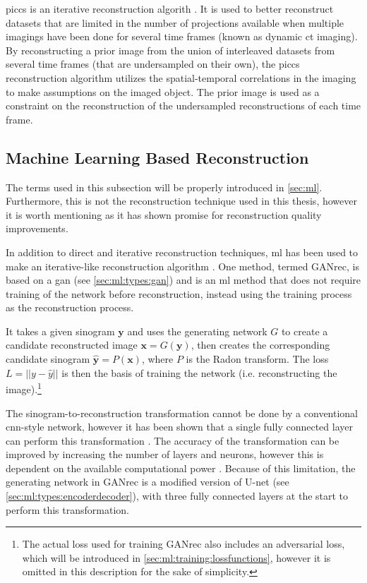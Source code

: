 \Gls{piccs} is an iterative reconstruction algorith \cite{piccs}. It is used to better reconstruct datasets that are limited in the number of projections available when multiple imagings have been done for several time frames (known as dynamic \gls{ct} imaging). By reconstructing a prior image from the union of interleaved datasets from several time frames (that are undersampled on their own), the \gls{piccs} reconstruction algorithm utilizes the spatial-temporal correlations in the imaging to make assumptions on the imaged object. The prior image is used as a constraint on the reconstruction of the undersampled reconstructions of each time frame. 


\subsection{Machine Learning Based Reconstruction}
The terms used in this subsection will be properly introduced in \cref{sec:ml}. Furthermore, this is not the reconstruction technique used in this thesis, however it is worth mentioning as it has shown promise for reconstruction quality improvements. 

In addition to direct and iterative reconstruction techniques, \gls{ml} has been used to make an iterative-like reconstruction algorithm \cite{GANrec}. One method, termed GANrec, is based on a \gls{gan} (see \cref{sec:ml:types:gan}) and is an \gls{ml} method that does not require training of the network before reconstruction, instead using the training process as the reconstruction process. 

It takes a given sinogram $\bm{y}$ and uses the generating network $G$ to create a candidate reconstructed image $\bm{x} = G(\bm{y})$, then creates the corresponding candidate sinogram $\hat{\bm{y}} = P(\bm{x})$, where $P$ is the Radon transform. The loss $L = \left|\left| y - \hat{y} \right|\right|$ is then the basis of training the network (i.e. reconstructing the image).\footnote{The actual loss used for training GANrec also includes an adversarial loss, which will be introduced in \cref{sec:ml:training:lossfunctions}, however it is omitted in this description for the sake of simplicity. }

The sinogram-to-reconstruction transformation cannot be done by a conventional \gls{cnn}-style network, however it has been shown that a single fully connected layer can perform this transformation \cite{PASCHALIS2004211}. The accuracy of the transformation can be improved by increasing the number of layers and neurons, however this is dependent on the available computational power \cite{GANrec}. Because of this limitation, the generating network in GANrec is a modified version of U-net \cite{unet} (see \cref{sec:ml:types:encoderdecoder}), with three fully connected layers at the start to perform this transformation. 
